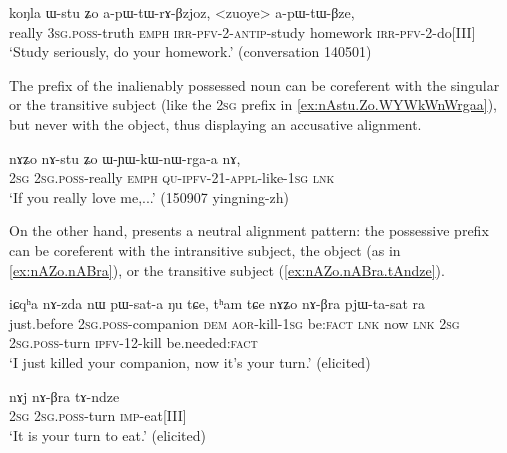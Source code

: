 \begin{exe}
\ex \label{ex:Wstu.Zo}
\gll koŋla ɯ-stu ʑo a-pɯ-tɯ-rɤ-βzjoz, <zuoye> a-pɯ-tɯ-βze, \\
really \textsc{3sg}.\textsc{poss}-truth \textsc{emph} \textsc{irr}-\textsc{pfv}-2-\textsc{antip}-study homework \textsc{irr}-\textsc{pfv}-2-do[III] \\
\glt `Study seriously, do your homework.' (conversation 140501)
\end{exe}

The prefix of the inalienably possessed noun  can be coreferent with the singular or the transitive subject (like the \textsc{2sg} prefix  in \ref{ex:nAstu.Zo.WYWkWnWrgaa}), but never with the object, thus displaying an accusative alignment.

\begin{exe}
\ex \label{ex:nAstu.Zo.WYWkWnWrgaa}
\gll nɤʑo nɤ-stu ʑo ɯ-ɲɯ-kɯ-nɯ-rga-a nɤ, \\
\textsc{2sg} \textsc{2sg}.\textsc{poss}-really \textsc{emph} \textsc{qu}-\textsc{ipfv}-2\fl{}1-\textsc{appl}-like-\textsc{1sg} \textsc{lnk} \\
\glt `If you really love me,...' (150907 yingning-zh) 
\end{exe}

On the other hand,  presents a neutral alignment pattern: the possessive prefix can be coreferent with the intransitive subject, the object (as in \ref{ex:nAZo.nABra}), or the transitive subject (\ref{ex:nAZo.nABra.tAndze}).


\begin{exe}
\ex \label{ex:nAZo.nABra}
\gll iɕqʰa nɤ-zda nɯ pɯ-sat-a ŋu tɕe, tʰam tɕe nɤʑo nɤ-βra pjɯ-ta-sat ra \\
just.before \textsc{2sg}.\textsc{poss}-companion \textsc{dem} \textsc{aor}-kill-\textsc{1sg} be:\textsc{fact} \textsc{lnk} now \textsc{lnk} \textsc{2sg} \textsc{2sg}.\textsc{poss}-turn \textsc{ipfv}-1\fl{}2-kill be.needed:\textsc{fact} \\
\glt `I just killed your companion, now it's your turn.' (elicited)
\end{exe}

\begin{exe}
\ex \label{ex:nAZo.nABra.tAndze}
\gll nɤj nɤ-βra tɤ-ndze \\
\textsc{2sg} \textsc{2sg}.\textsc{poss}-turn \textsc{imp}-eat[III] \\
\glt `It is your turn to eat.' (elicited)
\end{exe}

